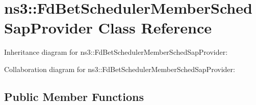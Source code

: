 \hypertarget{classns3_1_1FdBetSchedulerMemberSchedSapProvider}{}\section{ns3\+:\+:Fd\+Bet\+Scheduler\+Member\+Sched\+Sap\+Provider Class Reference}
\label{classns3_1_1FdBetSchedulerMemberSchedSapProvider}


Inheritance diagram for ns3\+:\+:Fd\+Bet\+Scheduler\+Member\+Sched\+Sap\+Provider\+:


Collaboration diagram for ns3\+:\+:Fd\+Bet\+Scheduler\+Member\+Sched\+Sap\+Provider\+:
\subsection*{Public Member Functions}
